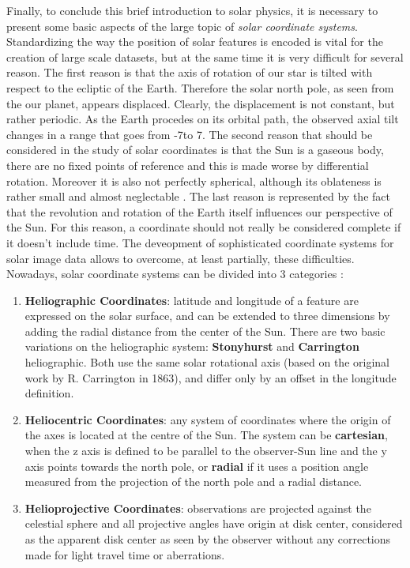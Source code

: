 Finally, to conclude this brief introduction to solar physics, it is necessary to present some basic aspects of the large topic of \textit{solar coordinate systems}. Standardizing the way the position of solar features is encoded is vital for the creation of large scale datasets, but at the same time it is very difficult for several reason. The first reason is that the axis of rotation of our star is tilted with respect to the ecliptic of the Earth. Therefore the solar north pole, as seen from the our planet, appears displaced. Clearly, the displacement is not constant, but rather periodic. As the Earth procedes on its orbital path, the observed axial tilt changes in a range that goes from -7\degree to 7\degree. The second reason that should be considered in the study of solar coordinates is that the Sun is a gaseous body, there are no fixed points of reference and this is made worse by differential rotation. Moreover it is also not perfectly spherical, although its oblateness is rather small and almost neglectable \cite{dicke1974oblateness}. The last reason is represented by the fact that the revolution and rotation of the Earth itself influences our perspective of the Sun. For this reason, a coordinate should not really be considered complete if it doesn't include time. The deveopment of sophisticated coordinate systems for solar image data allows to overcome, at least partially, these difficulties. Nowadays, solar coordinate systems can be divided into 3 categories \cite{thompson2006coordinate}:
\begin{enumerate}
  \item \textbf{Heliographic Coordinates}: latitude and longitude of a feature are expressed on the solar surface, and can be extended to three dimensions by adding the radial distance from the center of the Sun. There are two basic variations on the heliographic system: \textbf{Stonyhurst} and \textbf{Carrington} heliographic. Both use the same solar rotational axis (based on the original work by R. Carrington in 1863), and differ only by an offset in the longitude definition.
  \item \textbf{Heliocentric Coordinates}: any system of coordinates where the origin of the axes is located at the centre of the Sun. The system can be \textbf{cartesian}, when the z axis is defined to be parallel to the observer-Sun line and the y axis points towards the north pole, or \textbf{radial} if it uses a position angle measured from the projection of the north pole and a radial distance.
  \item \textbf{Helioprojective Coordinates}: observations are projected against the celestial sphere and all projective angles have origin at disk center, considered as the apparent disk center as seen by the observer without any corrections made for light travel time or aberrations.
\end{enumerate}



